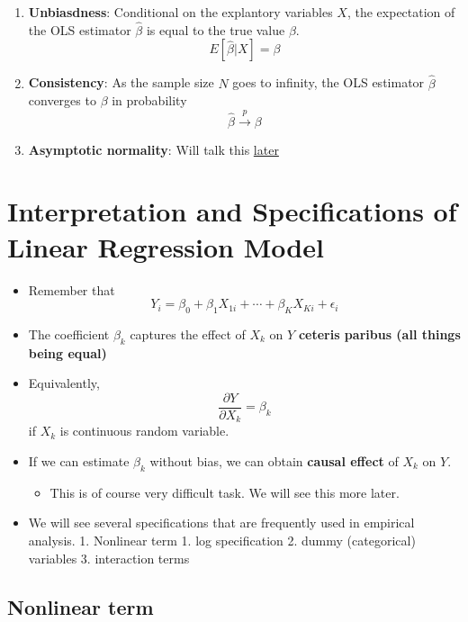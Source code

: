 \documentclass[]{book}
\providecommand{\tightlist}{%
  \setlength{\itemsep}{0pt}\setlength{\parskip}{0pt}}
\begin{document}
\begin{enumerate}
\def\labelenumi{\arabic{enumi}.}
\tightlist
\item
  \textbf{Unbiasdness}: Conditional on the explantory variables \(X\), the expectation of the OLS estimator \(\hat{\beta}\) is equal to the true value \(\beta\).
  \[
   E[\hat{\beta} | X] = \beta
   \]
\item
  \textbf{Consistency}: As the sample size \(N\) goes to infinity, the OLS estimator \(\hat{\beta}\) converges to \(\beta\) in probability
  \[
   \hat{\beta}\overset{p}{\longrightarrow}\beta
   \]
\item
  \textbf{Asymptotic normality}: Will talk this \protect\hyperlink{Statistical-Inference}{later}
\end{enumerate}

\hypertarget{interpretation-and-specifications-of-linear-regression-model}{%
\section{Interpretation and Specifications of Linear Regression Model}\label{interpretation-and-specifications-of-linear-regression-model}}

\begin{itemize}
\tightlist
\item
  Remember that
  \[ 
    Y_{i}=\beta_{0}+\beta_{1}X_{1i}+\cdots+\beta_{K}X_{Ki}+\epsilon_{i} 
    \]
\item
  The coefficient \(\beta_k\) captures the effect of \(X_k\) on \(Y\) \textbf{ceteris paribus (all things being equal)}
\item
  Equivalently,
  \[
    \frac{\partial Y}{\partial X_k} = \beta_k 
        \]
  if \(X_k\) is continuous random variable.
\item
  If we can estimate \(\beta_k\) without bias, we can obtain \textbf{causal effect} of \(X_k\) on \(Y\).

  \begin{itemize}
  \tightlist
  \item
    This is of course very difficult task. We will see this more later.
  \end{itemize}
\item
  We will see several specifications that are frequently used in empirical analysis.
  1. Nonlinear term
  1. log specification
  2. dummy (categorical) variables
  3. interaction terms
\end{itemize}

\hypertarget{nonlinear-term}{%
\subsection{Nonlinear term}\label{nonlinear-term}}
\end{document}
